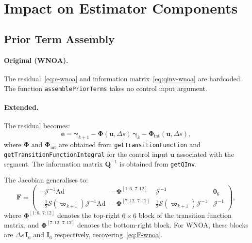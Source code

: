 \documentclass[11pt,a4paper]{article}
\newcommand{\Ad}{\mathrm{Ad}}
\newcommand{\Jac}{\mathcal{J}}
\newcommand{\curly}[1]{\mathcal{S}\!\left(#1\right)}
\newcommand{\inv}{^{-1}}
\newcommand{\bvarpi}{\bm{\varpi}}
\newcommand{\bgamma}{\bm{\gamma}}
\newcommand{\bPhi}{\bm{\Phi}}
\newcommand{\be}{\mathbf{e}}
\newcommand{\bF}{\mathbf{F}}
\newcommand{\bQ}{\mathbf{Q}}
\newcommand{\bI}{\mathbf{I}}
\newcommand{\bzero}{\mathbf{0}}
\begin{document}
\section{Impact on Estimator Components}
\label{sec:impact}

\subsection{Prior Term Assembly}
\label{sec:prior-change}

\paragraph{Original (WNOA).}
The residual~\eqref{eq:e-wnoa} and information matrix~\eqref{eq:qinv-wnoa} are hardcoded.
The function \texttt{assemblePriorTerms} takes no control input argument.

\paragraph{Extended.}
The residual becomes:
\begin{equation}
    \boxed{\be = \bgamma_{k+1} - \bPhi(\mathbf{u}, \Delta s)\,\bgamma_k - \bPhi_{\mathrm{int}}(\mathbf{u}, \Delta s),}
    \label{eq:e-general}
\end{equation}
where $\bPhi$ and $\bPhi_{\mathrm{int}}$ are obtained from \texttt{getTransitionFunction} and \texttt{getTransitionFunctionIntegral} for the control input $\mathbf{u}$ associated with the segment.
The information matrix $\bQ\inv$ is obtained from \texttt{getQInv}.

The Jacobian generalises to:
\begin{equation}
    \bF = \begin{pmatrix}
        -\Jac\inv \Ad & -\bPhi^{[1{:}6,\,7{:}12]} & \Jac\inv & \bzero_6 \\
        -\tfrac{1}{2}\curly{\bvarpi_{k+1}}\Jac\inv \Ad & -\bPhi^{[7{:}12,\,7{:}12]} & \tfrac{1}{2}\curly{\bvarpi_{k+1}}\Jac\inv & \Jac\inv
    \end{pmatrix},
    \label{eq:F-general}
\end{equation}
where $\bPhi^{[1{:}6,\,7{:}12]}$ denotes the top-right $6{\times}6$ block of the transition function matrix, and $\bPhi^{[7{:}12,\,7{:}12]}$ denotes the bottom-right block.
For WNOA, these blocks are $\Delta s\,\bI_6$ and $\bI_6$ respectively, recovering~\eqref{eq:F-wnoa}.
\end{document}
